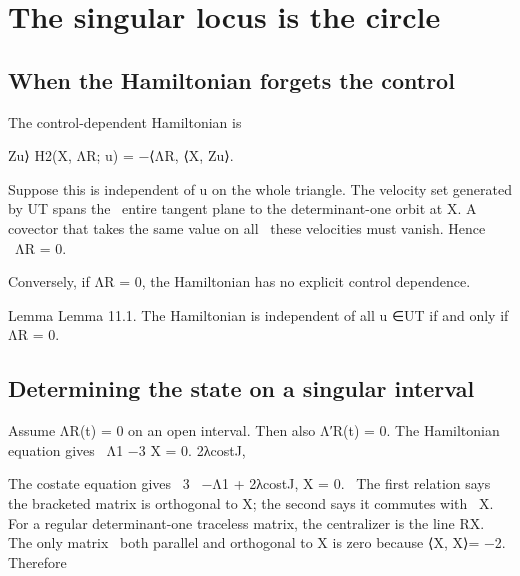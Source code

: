 \chapter{The singular locus is the circle}
\section{When the Hamiltonian forgets the control}

The control-dependent Hamiltonian is


\begin{displaytext}
Zu⟩ H2(X, ΛR; u) = −⟨ΛR, ⟨X, Zu⟩.
\end{displaytext}

\begin{displaytext}
Suppose this is independent of u on the whole triangle. The velocity set generated by UT spans the \
entire tangent plane to the determinant-one orbit at X. A covector that takes the same value on all \
these velocities must vanish. Hence \
ΛR = 0.
\end{displaytext}

\begin{displaytext}
Conversely, if ΛR = 0, the Hamiltonian has no explicit control dependence.
\end{displaytext}

\begin{statementbox}{Lemma}
Lemma 11.1. The Hamiltonian is independent of all u ∈UT if and only if ΛR = 0.
\end{statementbox}

\section{Determining the state on a singular interval}

\begin{displaytext}
Assume ΛR(t) = 0 on an open interval. Then also Λ′R(t) = 0. The Hamiltonian equation gives \
Λ1 −3 X = 0. 2λcostJ,
\end{displaytext}

\begin{displaytext}
The costate equation gives \
3 \
−Λ1 + 2λcostJ, X = 0. \
The first relation says the bracketed matrix is orthogonal to X; the second says it commutes with \
X. For a regular determinant-one traceless matrix, the centralizer is the line RX. The only matrix \
both parallel and orthogonal to X is zero because ⟨X, X⟩= −2. Therefore
\end{displaytext}

